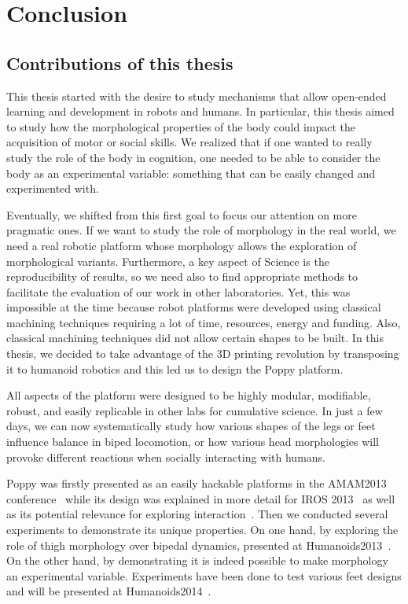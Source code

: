 
\chapter{Conclusion} %
\label{cha:conclusion}



\section{Contributions of this thesis} %
\label{sec:rappel_des_contributions}

This thesis started with the desire to study mechanisms that allow open-ended learning and development in robots and humans. In particular, this thesis aimed to study how the morphological properties of the body could impact the acquisition of motor or social skills.
We realized that if one wanted to really study the role of the body in cognition, one needed to be able to consider the body as an experimental variable: something that can be easily changed and experimented with.

Eventually, we shifted from this first goal to focus our attention on more pragmatic ones. If we want to study the role of morphology in the real world, we need a real robotic platform whose morphology allows the exploration of morphological variants. Furthermore, a key aspect of Science is the reproducibility of results, so we need also to find appropriate methods to facilitate the evaluation of our work in other laboratories.
Yet, this was impossible at the time because robot platforms were developed using classical machining techniques requiring a lot of time, resources, energy and funding. Also, classical machining techniques did not allow certain shapes to be built. In this thesis, we decided to take advantage of the 3D printing revolution by transposing it to humanoid robotics and this led us to design the Poppy platform.

All aspects of the platform were designed to be highly modular, modifiable, robust, and easily replicable in other labs for cumulative science. In just a few days, we can now systematically study how various shapes of the legs or feet influence balance in biped locomotion, or how various head morphologies will provoke different reactions when socially interacting with humans.

Poppy was firstly presented as an easily hackable platforms in the AMAM2013 conference~\parencite{lapeyre:hal-00788433} while its design was explained in more detail for IROS 2013~\parencite{lapeyre:hal-00852858} as well as its potential relevance for exploring interaction~\parencite{lapeyre:hal-00984312}. Then we conducted several experiments to demonstrate its unique properties. On one hand, by exploring the role of thigh morphology over bipedal dynamics, presented at Humanoids2013~\parencite{lapeyre:hal-00861110}. On the other hand, by demonstrating it is indeed possible to make morphology an experimental variable. Experiments have been done to test various feet designs and will be presented at Humanoids2014~\parencite{lapeyre2014humanoids}.

